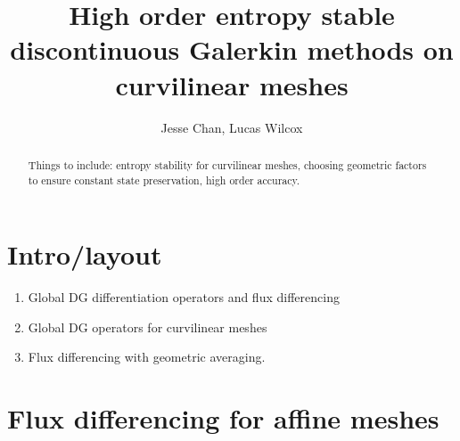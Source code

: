 \documentclass[preprint,10pt]{article}
\date{}
\author{Jesse Chan, Lucas Wilcox}
\title{High order entropy stable discontinuous Galerkin methods on curvilinear meshes}
\theoremstyle{definition}
\theoremstyle{lemma}
\theoremstyle{theorem}
\theoremstyle{assumption}
\begin{document}
\maketitle


\begin{abstract}
Things to include: entropy stability for curvilinear meshes, choosing geometric factors to ensure constant state preservation, high order accuracy.  
\end{abstract}

\section{Intro/layout}

\begin{enumerate}
\item Global DG differentiation operators and flux differencing 
\item Global DG operators for curvilinear meshes
\item Flux differencing with geometric averaging.  
\end{enumerate}



\section{Flux differencing for affine meshes}
\end{document}
